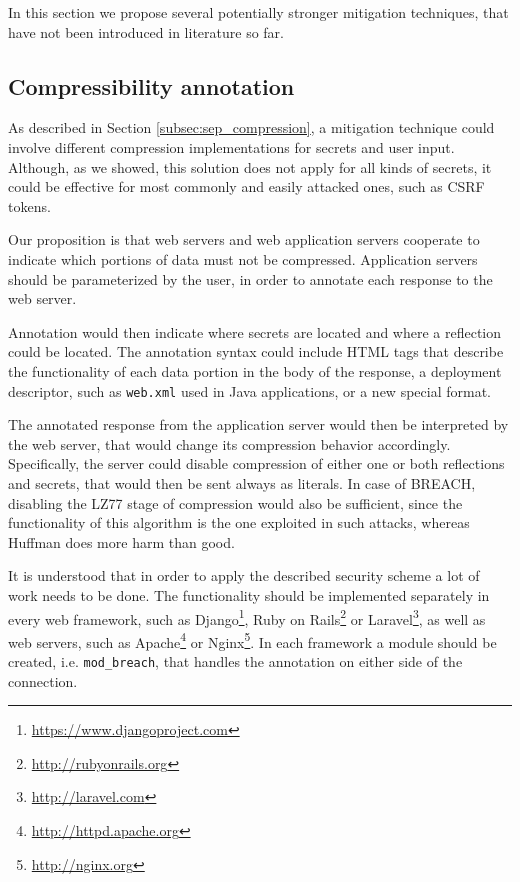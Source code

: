 In this section we propose several potentially stronger mitigation techniques,
that have not been introduced in literature so far.

\subsection{Compressibility annotation}

As described in Section \ref{subsec:sep_compression}, a mitigation technique
could involve different compression implementations for secrets and user input.
Although, as we showed, this solution does not apply for all kinds of secrets,
it could be effective for most commonly and easily attacked ones, such as CSRF
tokens.

Our proposition is that web servers and web application servers cooperate to
indicate which portions of data must not be compressed. Application servers
should be parameterized by the user, in order to annotate each response to the
web server.

Annotation would then indicate where secrets are located and where a reflection
could be located. The annotation syntax could include HTML tags that describe
the functionality of each data portion in the body of the response, a deployment
descriptor, such as \texttt{web.xml} used in Java applications, or a new special
format.

The annotated response from the application server would then be interpreted by
the web server, that would change its compression behavior accordingly.
Specifically, the server could disable compression of either one or both
reflections and secrets, that would then be sent always as literals. In case of
BREACH, disabling the LZ77 stage of compression would also be sufficient, since
the functionality of this algorithm is the one exploited in such attacks,
whereas Huffman does more harm than good.

It is understood that in order to apply the described security scheme a lot of
work needs to be done. The functionality should be implemented separately in
every web framework, such as
Django\footnote{\url{https://www.djangoproject.com}}, Ruby on
Rails\footnote{\url{http://rubyonrails.org}} or
Laravel\footnote{\url{http://laravel.com}}, as well as web servers, such as
Apache\footnote{\url{http://httpd.apache.org}} or
Nginx\footnote{\url{http://nginx.org}}. In each framework a module should be
created, i.e. \texttt{mod\_breach}, that handles the annotation on either side
of the connection.

